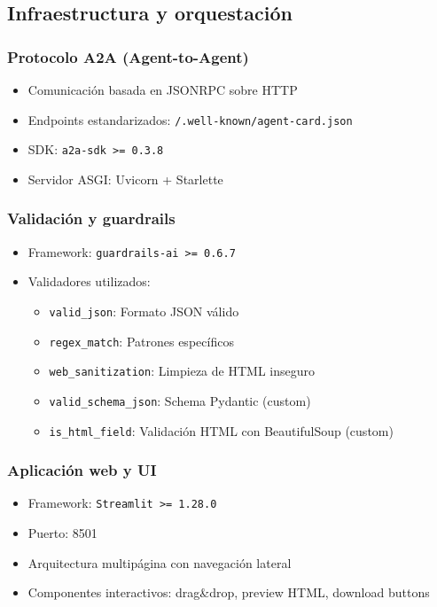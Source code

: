 \documentclass[12pt,a4paper]{article}
\begin{document}
\subsection{Infraestructura y orquestación}

\subsubsection{Protocolo A2A (Agent-to-Agent)}
\begin{itemize}
    \item Comunicación basada en JSONRPC sobre HTTP
    \item Endpoints estandarizados: \texttt{/.well-known/agent-card.json}
    \item SDK: \texttt{a2a-sdk >= 0.3.8}
    \item Servidor ASGI: Uvicorn + Starlette
\end{itemize}

\subsubsection{Validación y guardrails}
\begin{itemize}
    \item Framework: \texttt{guardrails-ai >= 0.6.7}
    \item Validadores utilizados:
    \begin{itemize}
        \item \texttt{valid\_json}: Formato JSON válido
        \item \texttt{regex\_match}: Patrones específicos
        \item \texttt{web\_sanitization}: Limpieza de HTML inseguro
        \item \texttt{valid\_schema\_json}: Schema Pydantic (custom)
        \item \texttt{is\_html\_field}: Validación HTML con BeautifulSoup (custom)
    \end{itemize}
\end{itemize}

\subsubsection{Aplicación web y UI}
\begin{itemize}
    \item Framework: \texttt{Streamlit >= 1.28.0}
    \item Puerto: 8501
    \item Arquitectura multipágina con navegación lateral
    \item Componentes interactivos: drag\&drop, preview HTML, download buttons
\end{itemize}
\end{document}
